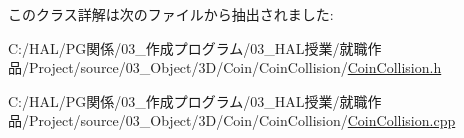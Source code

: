 このクラス詳解は次のファイルから抽出されました\+:\begin{DoxyCompactItemize}
\item 
C\+:/\+H\+A\+L/\+P\+G関係/03\+\_\+作成プログラム/03\+\_\+\+H\+A\+L授業/就職作品/\+Project/source/03\+\_\+\+Object/3\+D/\+Coin/\+Coin\+Collision/\mbox{\hyperlink{_coin_collision_8h}{Coin\+Collision.\+h}}\item 
C\+:/\+H\+A\+L/\+P\+G関係/03\+\_\+作成プログラム/03\+\_\+\+H\+A\+L授業/就職作品/\+Project/source/03\+\_\+\+Object/3\+D/\+Coin/\+Coin\+Collision/\mbox{\hyperlink{_coin_collision_8cpp}{Coin\+Collision.\+cpp}}\end{DoxyCompactItemize}

